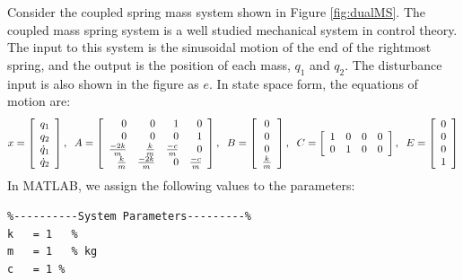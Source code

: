 \documentclass{amsart}
\theoremstyle{definition}
\theoremstyle{remark}
\numberwithin{equation}{section}
\begin{document}
Consider the coupled spring mass system shown in Figure \ref{fig:dualMS}. The coupled mass spring system is a well studied mechanical system in control theory. The input to this system is the sinusoidal motion of the end of the rightmost spring, and the output is the position of each mass, $q_1$ and $q_2$. The disturbance input is also shown in the figure as $e$. In state space form, the equations of motion are:
\begin{equation}
\begin{aligned}
x = \displaystyle \left [ \begin{array}{r}
q_1 \\
q_2 \\
\dot{q}_1 \\
\dot{q}_2 \\
\end{array} \right ], \hspace{2mm}
A = \displaystyle \left [ \begin{array}{rrrr}
0 & 0 & 1 & 0 \\
0 & 0 & 0 & 1 \\
\frac{-2k}{m} & \frac{k}{m} & \frac{-c}{m} & 0 \\
\frac{k}{m} & \frac{-2k}{m} & 0 & \frac{-c}{m}
 \end{array} \right ], \hspace{2mm}
B= \displaystyle \left [ \begin{array}{c}
 0 \\
 0\\
 0  \\
\frac{k}{m}
 \end{array} \right ], \hspace{2mm}
C = \displaystyle \left [ \begin{array}{rrrr}
1 & 0 & 0 & 0 \\
0 & 1 & 0 & 0 \\
\end{array} \right ], \hspace{2mm}
E = \displaystyle \left [ \begin{array}{r}
0\\
0\\
0\\
1 \end{array} \right ]
\end{aligned}
\end{equation}
In MATLAB, we assign the following values to the parameters:
\begin{verbatim}
%----------System Parameters---------%
k   = 1   %
m   = 1   % kg
c   = 1 %
\end{verbatim}
\end{document}
